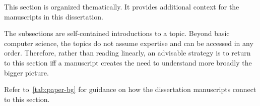 
This section is organized thematically.
It provides additional context for the manuscripts in this dissertation.

The subsections are self-contained introductions to a topic.
Beyond basic computer science, the topics do not assume expertise and can be accessed in any order.
Therefore, rather than reading linearly, an advisable strategy is to return to this section iff a manuscript creates the need to understand more broadly the {bigger picture}.

Refer to~\autoref{tab:paper-bg} for guidance on how the dissertation manuscripts connect to this section.
